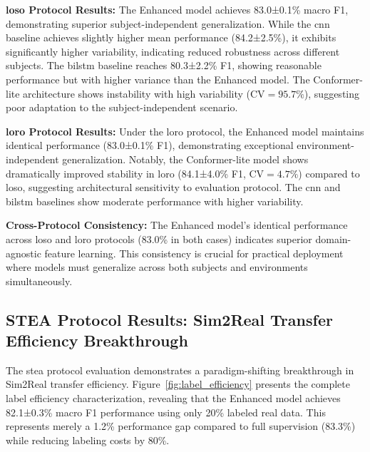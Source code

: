 \documentclass[journal]{IEEEtran}
\begin{document}
\textbf{\gls{loso} Protocol Results:} The Enhanced model achieves 83.0±0.1\% macro F1, demonstrating superior subject-independent generalization. While the \gls{cnn} baseline achieves slightly higher mean performance (84.2±2.5\%), it exhibits significantly higher variability, indicating reduced robustness across different subjects. The \gls{bilstm} baseline reaches 80.3±2.2\% F1, showing reasonable performance but with higher variance than the Enhanced model. The Conformer-lite architecture shows instability with high variability ($\text{CV}=95.7\%$), suggesting poor adaptation to the subject-independent scenario.

\textbf{\gls{loro} Protocol Results:} Under the \gls{loro} protocol, the Enhanced model maintains identical performance (83.0±0.1\% F1), demonstrating exceptional environment-independent generalization. Notably, the Conformer-lite model shows dramatically improved stability in \gls{loro} (84.1±4.0\% F1, $\text{CV}=4.7\%$) compared to \gls{loso}, suggesting architectural sensitivity to evaluation protocol. The \gls{cnn} and \gls{bilstm} baselines show moderate performance with higher variability.

\textbf{Cross-Protocol Consistency:} The Enhanced model's identical performance across \gls{loso} and \gls{loro} protocols (83.0\% in both cases) indicates superior domain-agnostic feature learning. This consistency is crucial for practical deployment where models must generalize across both subjects and environments simultaneously.

\subsection{STEA Protocol Results: Sim2Real Transfer Efficiency Breakthrough}

The \gls{stea} protocol evaluation demonstrates a paradigm-shifting breakthrough in Sim2Real transfer efficiency. Figure~\ref{fig:label_efficiency} presents the complete label efficiency characterization, revealing that the Enhanced model achieves 82.1±0.3\% macro F1 performance using only 20\% labeled real data. This represents merely a 1.2\% performance gap compared to full supervision (83.3\%) while reducing labeling costs by 80\%.
\end{document}
